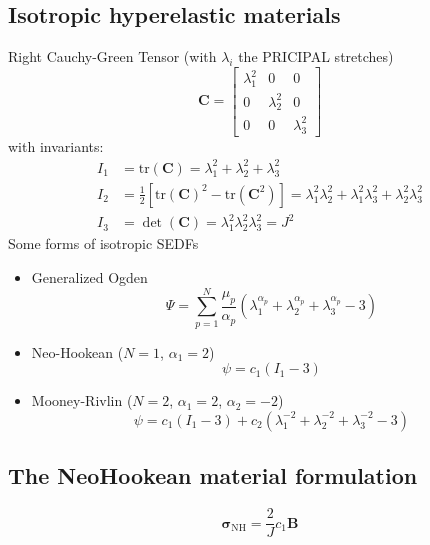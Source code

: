 \documentclass[../main.tex]{subfiles}
\begin{document}
\subsection{Isotropic hyperelastic materials}

Right Cauchy-Green Tensor (with $\lambda_i$ the PRICIPAL stretches)
\begin{equation}
    \textbf{C} = \left[\begin{matrix}
        \lambda_1^2 & 0 & 0 \\
        0 & \lambda_2^2 & 0 \\
        0 & 0 & \lambda_3^2
    \end{matrix}\right]
\end{equation}
with invariants:
\begin{align}
    I_1 & = \text{tr}(\textbf{C}) = \lambda_1^2 + \lambda_2^2 + \lambda_3^2\\
    I_2 & = \frac{1}{2}[\text{tr}(\textbf{C})^2 - \text{tr}(\textbf{C}^2)] = \lambda_1^2\lambda_2^2 + \lambda_1^2\lambda_3^2 + \lambda_2^2\lambda_3^2 \\
    I_3 & = \det(\textbf{C}) = \lambda_1^2\lambda_2^2\lambda_3^2 = J^2
\end{align}
Some forms of isotropic SEDFs
\begin{itemize}
    \item Generalized Ogden
    \begin{equation}
        \Psi = \sum^N_{p=1}\frac{\mu_p}{\alpha_p}(\lambda_1^{\alpha_p} + \lambda_2^{\alpha_p} + \lambda_3^{\alpha_p} - 3)
    \end{equation}
    \item Neo-Hookean ($N=1$, $\alpha_1=2$)
    \begin{equation}
        \psi = c_1(I_1 - 3)
    \end{equation}
    \item Mooney-Rivlin ($N = 2$, $\alpha_1=2$, $\alpha_2=-2$)
    \begin{equation}
        \psi = c_1(I_1 - 3) + c_2(\lambda_1^{-2} + \lambda_2^{-2} + \lambda_3^{-2} - 3)
    \end{equation}
\end{itemize}

\subsection{The NeoHookean material formulation}

\begin{equation}
    \bm{\sigma}_{\text{NH}} = \frac{2}{J}c_1\textbf{B}
\end{equation}
\end{document}
